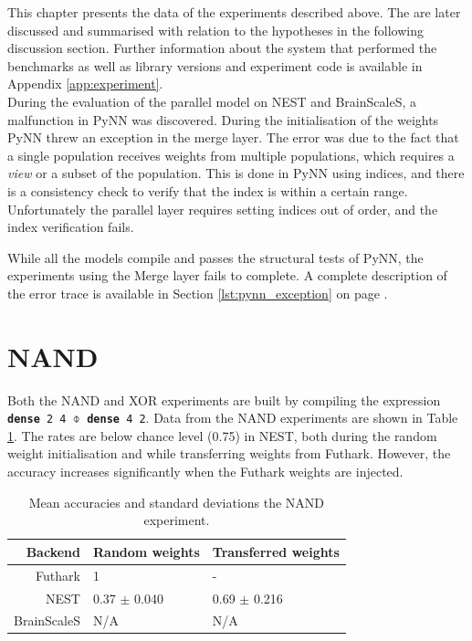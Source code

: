 \documentclass[report.tex]{subfiles}
\begin{document}
This chapter presents the data of the experiments described above.
The are later discussed and summarised with relation to the hypotheses in the
following discussion section.
Further information about the system that performed the benchmarks as well as
library versions and experiment code is available in Appendix
\ref{app:experiment}.
\\[0.3cm]

During the evaluation of the parallel model on NEST and BrainScaleS, a
malfunction in PyNN was discovered. 
During the initialisation of the weights PyNN threw an exception in the 
merge layer.
The error was due to the fact that a single population receives weights
from multiple populations, which requires a \textit{view} or a subset of the
population. 
This is done in PyNN using indices, and there is a consistency check to verify
that the index is within a certain range.
Unfortunately the parallel layer requires setting indices out of order, and
the index verification fails.

While all the models compile and passes the structural tests of PyNN,
the experiments using the Merge layer fails to complete.
A complete description of the error trace is available in Section
\ref{lst:pynn_exception} on page \pageref{lst:pynn_exception}.

\section{NAND}
Both the NAND and XOR experiments are built by compiling the expression 
\texttt{\textbf{dense} 2 4 $\obar$ \textbf{dense} 4 2}.
Data from the NAND experiments are shown in Table \ref{tab:xor}.
The rates are below chance level (0.75) in NEST, both during
the random weight initialisation and while transferring weights from Futhark.
However, the accuracy increases significantly when the Futhark weights are
injected.

\def\arraystretch{1.2}
\begin{table}
  \begin{tabular}{r|l l}
  \label{tab:nand}
  Backend & Random weights & Transferred weights \\ \hline
  Futhark & 1 & - \\
  NEST & 0.37 $\pm$ 0.040 & 0.69 $\pm$ 0.216\\ 
  BrainScaleS & N/A & N/A
  \end{tabular}
  \caption{Mean accuracies and standard deviations the NAND experiment.}
  \label{tab:xor}
\end{table}
\end{document}
